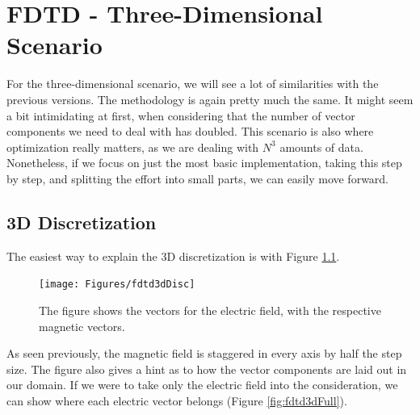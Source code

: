 
\chapter{FDTD - Three-Dimensional Scenario} %

\label{Chapter4} %


For the three-dimensional scenario, we will see a lot of similarities with the previous versions. The methodology is again pretty much the same. It might seem a bit intimidating at first, when considering that the number of vector components we need to deal with has doubled. This scenario is also where optimization really matters, as we are dealing with $N^3$ amounts of data. Nonetheless, if we focus on just the most basic implementation, taking this step by step, and splitting the effort into small parts, we can easily move forward.

\clearpage

\section{3D Discretization}

The easiest way to explain the 3D discretization is with Figure \ref{fig:fdtd3dDisc}.

\begin{figure}[h!]
	\centering
	\texttt{[image: Figures/fdtd3dDisc]}
	\decoRule
	\caption[3D Electric Discretization]{The figure shows the vectors for the electric field, with the respective magnetic vectors.}
	\label{fig:fdtd3dDisc}
\end{figure}

As seen previously, the magnetic field is staggered in every axis by half the step size. The figure also gives a hint as to how the vector components are laid out in our domain. If we were to take only the electric field into the consideration, we can show where each electric vector belongs (Figure \ref{fig:fdtd3dFull}). 

